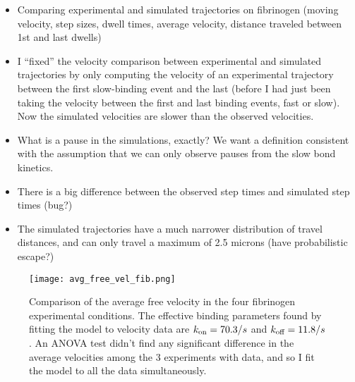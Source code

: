 \documentclass{article}
\newcommand{\tn}{\textnormal}
\begin{document}
\begin{itemize}
\item Comparing experimental and simulated trajectories on fibrinogen
  (moving velocity, step sizes, dwell times, average velocity,
  distance traveled between 1st and last dwells)
\item I ``fixed'' the velocity comparison between experimental and
  simulated trajectories by only computing the velocity of an
  experimental trajectory between the first slow-binding event and the
  last (before I had just been taking the velocity between the first
  and last binding events, fast or slow). Now the simulated velocities
  are slower than the observed velocities.
\item What is a pause in the simulations, exactly? We want a
  definition consistent with the assumption that we can only observe
  pauses from the slow bond kinetics.
\item There is a big difference between the observed step times and
  simulated step times (bug?)
\item The simulated trajectories have a much narrower distribution of
  travel distances, and can only travel a maximum of 2.5 microns (have
  probabilistic escape?)
\end{itemize}


\begin{figure}
  \centering
  \texttt{[image: avg\_free\_vel\_fib.png]}
  \caption{Comparison of the average free velocity in the four
    fibrinogen experimental conditions. The effective binding
    parameters found by fitting the model to velocity data are
    $k_\tn{on} = 70.3 / s$ and $k_\tn{off} = 11.8 / s$. An ANOVA test
    didn't find any significant difference in the average velocities
    among the 3 experiments with data, and so I fit the model to all
    the data simultaneously.}
  \label{fig:avg-free-vel-fib}
\end{figure}
\end{document}

